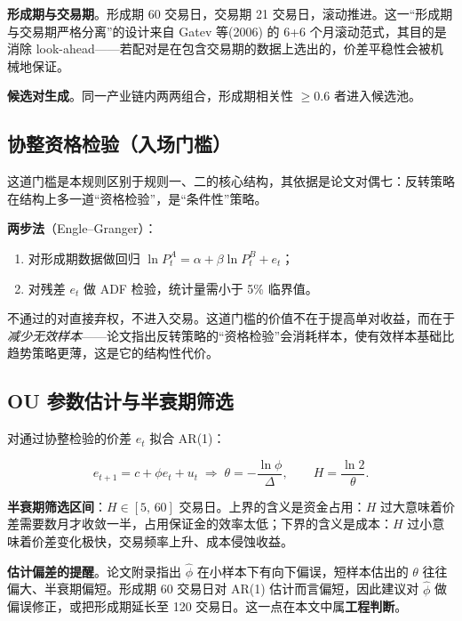 \textbf{形成期与交易期}。形成期 60 交易日，交易期 21 交易日，滚动推进。这一“形成期与交易期严格分离”的设计来自 Gatev 等(2006) 的 6+6 个月滚动范式\cite{gatev2006}，其目的是消除 look-ahead——若配对是在包含交易期的数据上选出的，价差平稳性会被机械地保证。

\textbf{候选对生成}。同一产业链内两两组合，形成期相关性 $\ge0.6$ 者进入候选池。

\subsection{协整资格检验（入场门槛）}

这道门槛是本规则区别于规则一、二的核心结构，其依据是论文对偶七：反转策略在结构上多一道“资格检验”，是“条件性”策略。

\textbf{两步法}（Engle--Granger\cite{englegranger1987}）：

\begin{enumerate}[leftmargin=2.2em]
  \item 对形成期数据做回归 $\ln P^A_t=\alpha+\beta\ln P^B_t+e_t$；
  \item 对残差 $e_t$ 做 ADF 检验\cite{dickeyfuller1979}，统计量需小于 5\% 临界值。
\end{enumerate}

不通过的对直接弃权，不进入交易。这道门槛的价值不在于提高单对收益，而在于\emph{减少无效样本}——论文指出反转策略的“资格检验”会消耗样本，使有效样本基础比趋势策略更薄，这是它的结构性代价。

\subsection{OU 参数估计与半衰期筛选}

对通过协整检验的价差 $e_t$ 拟合 AR(1)：

\begin{equation}
e_{t+1}=c+\phi e_t+u_t \;\Longrightarrow\;
\theta=-\frac{\ln\phi}{\Delta},\qquad
H=\frac{\ln 2}{\theta} .
\end{equation}

\textbf{半衰期筛选区间}：$H\in[5,\,60]$ 交易日。上界的含义是资金占用：$H$ 过大意味着价差需要数月才收敛一半，占用保证金的效率太低；下界的含义是成本：$H$ 过小意味着价差变化极快，交易频率上升、成本侵蚀收益。

\textbf{估计偏差的提醒}。论文附录指出 $\hat\phi$ 在小样本下有向下偏误，短样本估出的 $\theta$ 往往偏大、半衰期偏短\cite{kendall1953}。形成期 60 交易日对 AR(1) 估计而言偏短，因此建议对 $\hat\phi$ 做偏误修正，或把形成期延长至 120 交易日。这一点在本文中属\textbf{工程判断}。

